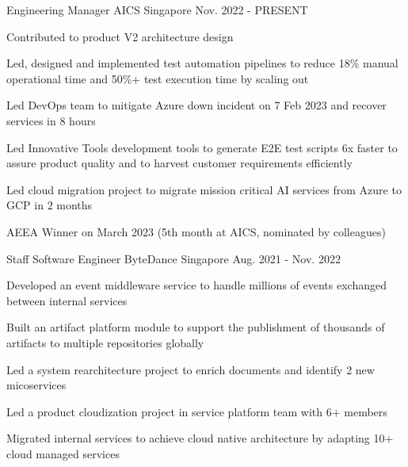 

\begin{cventries}

  \cventry
    {Engineering Manager} %
    {AICS} %
    {Singapore} %
    {Nov. 2022 - PRESENT} %
    {
      \begin{cvitems} %
        \item {Contributed to product V2 architecture design}
        \item {Led, designed and implemented test automation pipelines to reduce 18\% manual operational time and 50\%+ test execution time by scaling out}
        \item {Led DevOps team to mitigate Azure down incident on 7 Feb 2023 and recover services in 8 hours}
        \item {Led Innovative Tools development tools to generate E2E test scripts 6x faster to assure product quality and to harvest customer requirements efficiently}
				\item {Led cloud migration project to migrate mission critical AI services from Azure to GCP in 2 months}
        \item {AEEA Winner on March 2023 (5th month at AICS, nominated by colleagues)}
      \end{cvitems}
    }

  \cventry
    {Staff Software Engineer} %
    {ByteDance} %
    {Singapore} %
    {Aug. 2021 - Nov. 2022} %
    {
      \begin{cvitems} %
        \item {Developed an event middleware service to handle millions of events exchanged between internal services}
        \item {Built an artifact platform module to support the publishment of thousands of artifacts to multiple repositories globally}
        \item {Led a system rearchitecture project to enrich documents and identify 2 new micoservices}
        \item {Led a product cloudization project in service platform team with 6+ members}
				\item {Migrated internal services to achieve cloud native architecture by adapting 10+ cloud managed services}
      \end{cvitems}
    }


\end{cventries}
